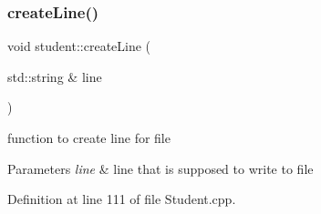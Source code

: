 \subsubsection{\texorpdfstring{create\+Line()}{createLine()}}
{\footnotesize\ttfamily void student\+::create\+Line (\begin{DoxyParamCaption}\item[{std\+::string \&}]{line }\end{DoxyParamCaption})}

function to create line for file 
\begin{DoxyParams}{Parameters}
{\em line} & line that is supposed to write to file \\
\hline
\end{DoxyParams}


Definition at line 111 of file Student.\+cpp.


